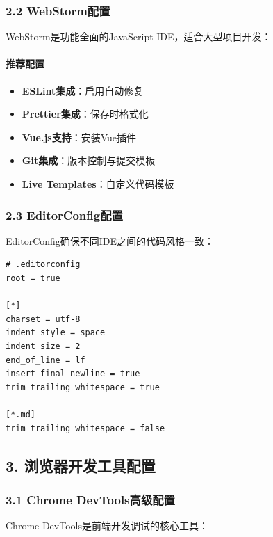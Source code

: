 \subsubsection{2.2 WebStorm配置}\label{webstormux914dux7f6e}

WebStorm是功能全面的JavaScript IDE，适合大型项目开发：

\paragraph{推荐配置}\label{ux63a8ux8350ux914dux7f6e}

\begin{itemize}
\tightlist
\item
  \textbf{ESLint集成}：启用自动修复
\item
  \textbf{Prettier集成}：保存时格式化
\item
  \textbf{Vue.js支持}：安装Vue插件
\item
  \textbf{Git集成}：版本控制与提交模板
\item
  \textbf{Live Templates}：自定义代码模板
\end{itemize}

\subsubsection{2.3 EditorConfig配置}\label{editorconfigux914dux7f6e}

EditorConfig确保不同IDE之间的代码风格一致：

\begin{lstlisting}
# .editorconfig
root = true

[*]
charset = utf-8
indent_style = space
indent_size = 2
end_of_line = lf
insert_final_newline = true
trim_trailing_whitespace = true

[*.md]
trim_trailing_whitespace = false
\end{lstlisting}

\subsection{3.
浏览器开发工具配置}\label{ux6d4fux89c8ux5668ux5f00ux53d1ux5de5ux5177ux914dux7f6e}

\subsubsection{3.1 Chrome
DevTools高级配置}\label{chrome-devtoolsux9ad8ux7ea7ux914dux7f6e}

Chrome DevTools是前端开发调试的核心工具：

